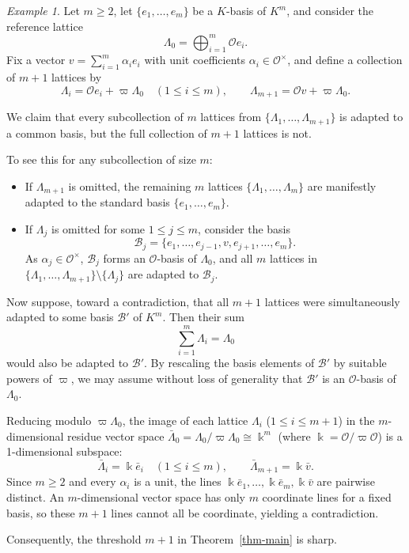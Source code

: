 \documentclass[12pt]{amsart}
\theoremstyle{definition}
\theoremstyle{remark}
\newtheorem{example}[theorem]{Example}
\begin{document}
\begin{example}
\label{ex:lattice-helly-sharpness}
Let $m \ge 2$, let $\{e_1, \dots, e_m\}$ be a $K$-basis of $K^m$, and consider the reference lattice
\[
  \Lambda_0 = \bigoplus_{i=1}^{m} \mathcal{O} e_i.
\]
Fix a vector $v = \sum\limits_{i=1}^{m} \alpha_i e_i$ with unit coefficients $\alpha_i \in \mathcal{O}^\times$, and define a collection of $m+1$ lattices by
\[
  \Lambda_i = \mathcal{O} e_i + \varpi \Lambda_0 \quad (1 \le i \le m),
  \qquad
  \Lambda_{m+1} = \mathcal{O} v + \varpi \Lambda_0.
\]

We claim that every subcollection of $m$ lattices from $\{\Lambda_1, \dots, \Lambda_{m+1}\}$ is adapted to a common basis, but the full collection of $m+1$ lattices is not.

To see this for any subcollection of size $m$:
\begin{itemize}
  \item If $\Lambda_{m+1}$ is omitted, the remaining $m$ lattices $\{\Lambda_1, \dots, \Lambda_m\}$ are manifestly adapted to the standard basis $\{e_1, \dots, e_m\}$.
  \item If $\Lambda_j$ is omitted for some $1 \le j \le m$, consider the basis 
  \[
  \mathcal{B}_j = \{e_1, \dots, e_{j-1}, v, e_{j+1}, \dots, e_m\}.
  \]
  As $\alpha_j \in \mathcal{O}^\times$, $\mathcal{B}_j$ forms an $\mathcal{O}$-basis of $\Lambda_0$, and all $m$ lattices in $\{\Lambda_1, \dots, \Lambda_{m+1}\} \setminus \{\Lambda_j\}$ are adapted to $\mathcal{B}_j$.
\end{itemize}

Now suppose, toward a contradiction, that all $m+1$ lattices were simultaneously adapted to some basis $\mathcal{B}'$ of $K^m$. Then their sum
\[
  \sum_{i=1}^{m} \Lambda_i = \Lambda_0
\]
would also be adapted to $\mathcal{B}'$. By rescaling the basis elements of $\mathcal{B}'$ by suitable powers of $\varpi$, we may assume without loss of generality that $\mathcal{B}'$ is an $\mathcal{O}$-basis of $\Lambda_0$. 

Reducing modulo $\varpi \Lambda_0$, the image of each lattice $\Lambda_i$ ($1 \le i \le m+1$) in the $m$-dimensional residue vector space $\bar{\Lambda}_0 = \Lambda_0 / \varpi \Lambda_0 \cong \Bbbk^m$ (where $\Bbbk = \mathcal{O}/\varpi\mathcal{O}$) is a 1-dimensional subspace:
\[
  \bar{\Lambda}_i = \Bbbk \bar{e}_i \quad (1 \le i \le m),
  \qquad
  \bar{\Lambda}_{m+1} = \Bbbk \bar{v}.
\]
Since $m\ge2$ and every $\alpha_i$ is a unit, the lines
$\Bbbk\bar e_1,\ldots,\Bbbk\bar e_m,\Bbbk\bar v$ are pairwise distinct. An $m$-dimensional vector space has only $m$ coordinate lines for a fixed basis, so these $m+1$ lines cannot all be coordinate, yielding a contradiction. 

Consequently, the threshold $m+1$ in Theorem~\ref{thm-main} is sharp.
\end{example}
\end{document}
